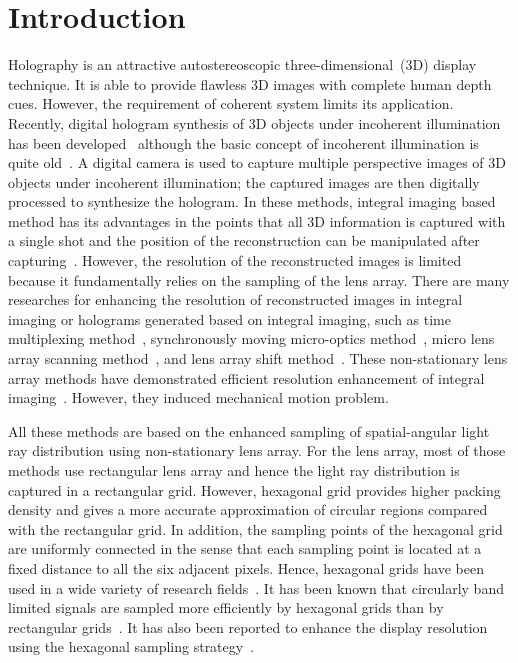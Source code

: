 \documentclass[10pt,letterpaper]{article}
\begin{document}
\section{Introduction}
Holography is an attractive autostereoscopic three-dimensional~(3D) display technique. It is able to provide flawless 3D images with complete human depth cues. However, the requirement of coherent system limits its application. Recently, digital hologram synthesis of 3D objects under incoherent illumination has been developed~\cite{Shaked_2009_AO,Park_2009_OE} although the basic concept of incoherent illumination is quite old~\cite{Pole_1967_APL}. A digital camera is used to capture multiple perspective images of 3D objects under incoherent illumination; the captured images are then digitally processed to synthesize the hologram. In these methods, integral imaging based method has its advantages in the points that all 3D information is captured with a single shot and the position of the reconstruction can be manipulated after capturing~\cite{Park_2009_OE}. However, the resolution of the reconstructed images is limited because it fundamentally relies on the sampling of the lens array. There are many researches for enhancing the resolution of reconstructed images in integral imaging or holograms generated based on integral imaging, such as time multiplexing method~\cite{Hong_2011_AO,Hong_2004_OL,Kishk_2003_OE}, synchronously moving micro-optics method~\cite{Hong_2004_OL,Jang_2002_OL}, micro lens array scanning method~\cite{Erdmann_2001_AO}, and lens array shift method~\cite{Chen_2010_OE,Lim_2009_OE}. These non-stationary lens array methods have demonstrated efficient resolution enhancement of integral imaging~\cite{Lee_2001_OL,Park_2009_AO}. However, they induced mechanical motion problem.

All these methods are based on the enhanced sampling of spatial-angular light ray distribution using non-stationary lens array. For the lens array, most of those methods use rectangular lens array and hence the light ray distribution is captured in a rectangular grid. However, hexagonal grid provides higher packing density and gives a more accurate approximation of circular regions compared with the rectangular grid. In addition, the sampling points of the hexagonal grid are uniformly connected in the sense that each sampling point is located at a fixed distance to all the six adjacent pixels. Hence, hexagonal grids have been used in a wide variety of research fields~\cite{Middleton_2005,Jurasinski_2006}. It has been known that circularly band limited signals are sampled more efficiently by hexagonal grids than by rectangular grids~\cite{Petersen_1962_IC,Murphy_1982_JOSA,Baronti_2001_SPIE}. It has also been reported to enhance the display resolution using the hexagonal sampling strategy~\cite{Park_2010_SPIE,Chen_2010_SPIE}. 
\end{document}
